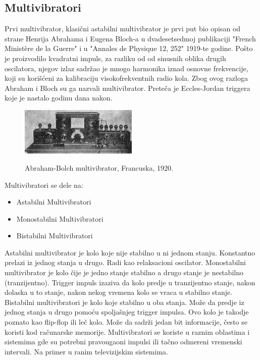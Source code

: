 \documentclass[12pt,a4paper]{article}
\begin{document}
\subsection{Multivibratori}
Prvi multivibrator, klasični astabilni multivibrator je prvi put bio opisan od strane Henrija Abrahama i Eugena Bloch-a u dvadesetsedmoj publikaciji "French Ministère de la Guerre" i u "Annales de Physique 12, 252" 1919-te godine. 
Pošto je proizvodilo kvadratni impuls, za razliku od od sinusnih oblika drugih oscilatora, njegov izlaz sadržao je mnogo harmonika iznad osnovne frekvencije,  koji su korišćeni za kalibraciju visokofrekventnih radio kola. Zbog ovog razloga Abraham i Bloch su ga nazvali multivibrator. Preteča je Eccles-Jordan triggera koje je nastalo godinu dana nakon. 
\begin{figure}[h]
  \centering
  \includegraphics[width=0.5\textwidth]{vakum}
  \caption{Abraham-Bolch multivibrator, Francuska, 1920.}\cite{multivibrator}
\end{figure}
\newline
Multivibratori se dele na:
\begin{itemize}
  \item Astabilni Multivibratori
  \item Monostabilni Multivibratori
  \item Bistabilni Multivibratori
\end{itemize}
Astabilni multivibrator je kolo koje nije stabilno u ni jednom stanju. 
Konstantno prelazi iz jednog stanja u drugo. Radi kao relaksacioni oscilator. 
\newline
Monostabilni multivibrator je kolo čije je jedno stanje stabilno a drugo stanje je nestabilno (tranzijentno). Trigger impuls izaziva da kolo predje u tranzijentno stanje, nakon dolaska u to stanje, nakon nekog vremena kolo se vraca u stabilno stanje. 
\newline
Bistabilni multivibratori je kolo koje stabilno u oba stanja. Može da predje iz jednog stanja u drugo pomoću spoljašnjeg trigger impulsa. Ovo kolo je takodje poznato kao flip-flop ili leč kolo. Može da sadrži jedan bit informacije, često se koristi kod računarske memorije. 
Multivibratori se koriste u raznim oblastima i sistemima gde su potrebni pravougaoni impulsi ili tačno odmereni vremenski intervali. Na primer u ranim televizijskim sistemima.
\end{document}
